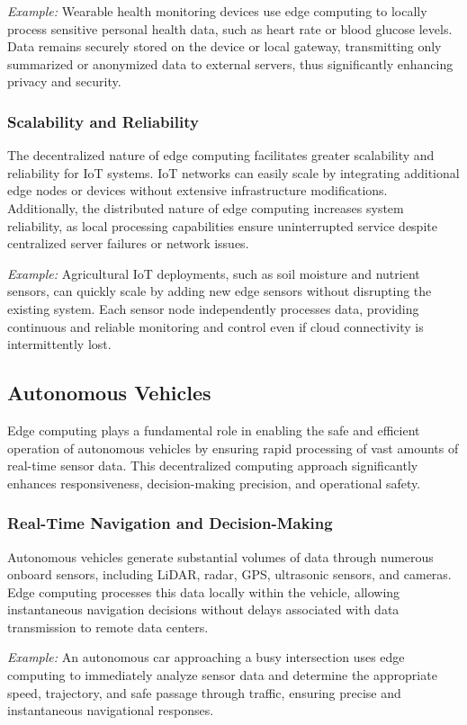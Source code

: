 \documentclass[runningheads]{llncs}
\begin{document}
\textit{Example:} Wearable health monitoring devices use edge computing to locally process sensitive personal health data, such as heart rate or blood glucose levels. Data remains securely stored on the device or local gateway, transmitting only summarized or anonymized data to external servers, thus significantly enhancing privacy and security.

\subsubsection{Scalability and Reliability}
The decentralized nature of edge computing facilitates greater scalability and reliability for IoT systems. IoT networks can easily scale by integrating additional edge nodes or devices without extensive infrastructure modifications. Additionally, the distributed nature of edge computing increases system reliability, as local processing capabilities ensure uninterrupted service despite centralized server failures or network issues.

\textit{Example:} Agricultural IoT deployments, such as soil moisture and nutrient sensors, can quickly scale by adding new edge sensors without disrupting the existing system. Each sensor node independently processes data, providing continuous and reliable monitoring and control even if cloud connectivity is intermittently lost.
\subsection{Autonomous Vehicles}

Edge computing plays a fundamental role in enabling the safe and efficient operation of autonomous vehicles by ensuring rapid processing of vast amounts of real-time sensor data. This decentralized computing approach significantly enhances responsiveness, decision-making precision, and operational safety.

\subsubsection{Real-Time Navigation and Decision-Making}
Autonomous vehicles generate substantial volumes of data through numerous onboard sensors, including LiDAR, radar, GPS, ultrasonic sensors, and cameras. Edge computing processes this data locally within the vehicle, allowing instantaneous navigation decisions without delays associated with data transmission to remote data centers.

\textit{Example:} An autonomous car approaching a busy intersection uses edge computing to immediately analyze sensor data and determine the appropriate speed, trajectory, and safe passage through traffic, ensuring precise and instantaneous navigational responses.
\end{document}

